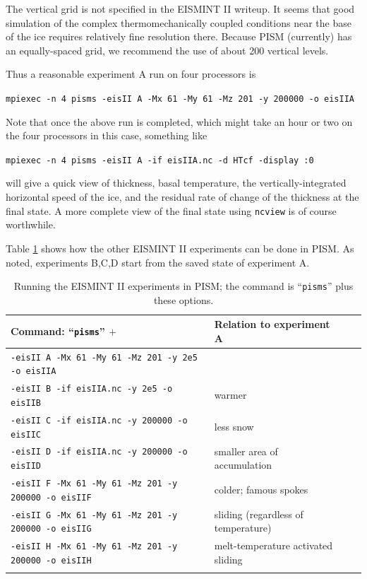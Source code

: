 \documentclass[11pt,final]{amsart}
\renewcommand{\t}[1]{\texttt{#1}}
\begin{document}
The vertical grid is not specified in the EISMINT II writeup.  It seems that good simulation of the complex thermomechanically coupled conditions near the base of the ice requires relatively fine resolution there.  Because PISM (currently) has an equally-spaced grid, we recommend the use of about 200 vertical levels.

Thus a reasonable experiment A run on four processors is

\verb|mpiexec -n 4 pisms -eisII A -Mx 61 -My 61 -Mz 201 -y 200000 -o eisIIA|

\noindent Note that once the above run is completed, which might take an hour or two on the four processors in this case, something like

\verb|mpiexec -n 4 pisms -eisII A -if eisIIA.nc -d HTcf -display :0|

\noindent will give a quick view of thickness, basal temperature, the vertically-integrated horizontal speed of the ice, and the residual rate of change of the thickness at the final state.  A more complete view of the final state using \verb|ncview| is of course worthwhile.

Table \ref{tab:eisII} shows how the other EISMINT II experiments can be done in PISM.  As noted, experiments B,C,D start from the saved state of experiment A.

\begin{table}[h]
\caption{Running the EISMINT II experiments in PISM; the command is ``\t{pisms}'' plus these options.}\label{tab:eisII}
\small
\begin{tabular}{@{}llll}\hline
\textbf{Command: ``\t{pisms}'' $+$} & \textbf{Relation to experiment A} \\ \hline
\verb|-eisII A -Mx 61 -My 61 -Mz 201 -y 2e5 -o eisIIA| & \\
\verb|-eisII B -if eisIIA.nc -y 2e5 -o eisIIB| & warmer \\
\verb|-eisII C -if eisIIA.nc -y 200000 -o eisIIC| & less snow \\
\verb|-eisII D -if eisIIA.nc -y 200000 -o eisIID| & smaller area of accumulation \\
\verb|-eisII F -Mx 61 -My 61 -Mz 201 -y 200000 -o eisIIF| & colder; famous spokes \cite{BBL} \\
\verb|-eisII G -Mx 61 -My 61 -Mz 201 -y 200000 -o eisIIG| & sliding (regardless of temperature) \\
\verb|-eisII H -Mx 61 -My 61 -Mz 201 -y 200000 -o eisIIH| & melt-temperature activated sliding \\
\hline\normalsize
\end{tabular}\end{table}
\end{document}
